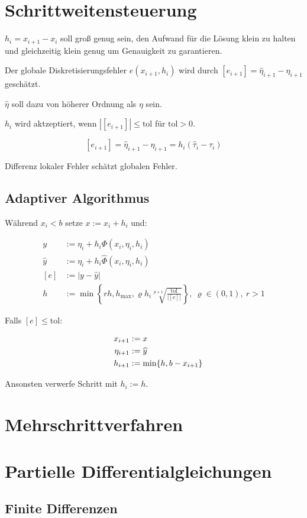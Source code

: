 \section*{Schrittweitensteuerung}

$h_i = x_{i+1} - x_i$ soll groß genug sein, den Aufwand für die Lösung klein zu halten und gleichzeitig klein genug um Genauigkeit zu garantieren.

\spacing

Der globale Diskretisierungsfehler $e(x_{i+1},h_i)$ wird durch $[e_{i+1}] = \widehat{\eta}_{i+1} - \eta_{i+1}$ geschätzt.

$\widehat{\eta}$ soll dazu von höherer Ordnung als $\eta$ sein.

$h_i$ wird aktzeptiert, wenn $|[e_{i+1}]| \leq \text{tol}$ für $\text{tol} > 0$.

\vspace{-2mm}
$$[e_{i+1}] = \widehat{\eta}_{i+1} - \eta_{i+1} = h_i(\widehat{\tau}_i - \tau_i)$$

Differenz lokaler Fehler schätzt globalen Fehler.

\subsection*{Adaptiver Algorithmus}

Während $x_i < b$ setze $x := x_i + h_i$ und:

\vspace{-4mm}
\begin{align*}
y &:= \eta_i + h_i \Phi(x_i,\eta_i,h_i) \\
\widehat{y} &:= \eta_i + h_i \widehat{\Phi}(x_i,\eta_i,h_i) \\
[e] &:= |y-\widehat{y}| \\
h &:= \min\left\{rh, h_\text{max}, \varrho h_i \sqrt[p+1]{\frac{\text{tol}}{|[e]|}}\right\}, \ \varrho \in (0,1), \ r > 1
\end{align*}

Falls $[e] \leq \text{tol}$:

\vspace*{-10.7mm}
\begin{align*}
\hspace*{4mm}
x_{i+1} &:= x \\
\eta_{i+1} &:= \widehat{y} \\
h_{i+1} &:= \min\{h, b-x_{i+1}\}
\end{align*}

Ansonsten verwerfe Schritt mit $h_i := h$.

\section*{Mehrschrittverfahren}

\section*{Partielle Differentialgleichungen}

\subsection*{Finite Differenzen}
